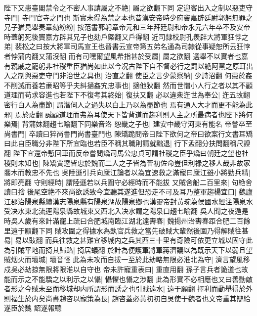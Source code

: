 陛下又患臺閣禁令之不密人事請屬之不絶|{
	屬之欲翻下同}
定迎客出入之制以惡吏守寺門|{
	寺門官寺之門也}
斯實未得為禁之本也昔漢安帝時少府竇嘉辟廷尉郭躬無罪之兄子猶見舉奏章劾紛紛|{
	按范書郭躬章帝元和三年拜廷尉和帝永元六年卒不及安帝時蓋躬死後竇嘉方辟其兄子也劾戶槩翻又戶得翻}
近司隸校尉孔羨辟大將軍狂悖之弟|{
	裴松之曰按大將軍司馬宣王也晉書云宣帝第五弟名通為司隸從事疑恕所云狂悖者悖蒲内翻又蒲沒翻}
而有司嘿爾望風希指甚於受屬|{
	屬之欲翻}
選舉不以實者也嘉有親戚之寵躬非社稷重臣猶尚如此以今况古陛下自不督必行之罰以絶阿黨之原耳出入之制與惡吏守門非治世之具也|{
	治直之翻}
使臣之言少蒙察納|{
	少詩沼翻}
何患於姦不削滅而養若亷昭等乎夫糾擿姦宄忠事也|{
	擿他狄翻}
然而世憎小人行之者以其不顧道理而苟求容進也若陛下不復考其終始|{
	復扶又翻}
必以違衆迕世為奉公|{
	迕五故翻}
密行白人為盡節|{
	謂潛伺人之過失以白上乃以為盡節也}
焉有通人大才而更不能為此邪|{
	焉於䖍翻}
誠顧道理而弗為耳使天下皆背道而趨利則人主之所最病者也陛下將何樂焉|{
	背蒲妹翻趨七喻翻下同樂音洛}
恕畿之子也|{
	建安中畿守河東有能名}
帝嘗卒至尚書門|{
	卒讀曰猝尚書門尚書臺門也}
陳矯跪問帝曰陛下欲何之帝曰欲案行文書耳矯曰此自臣職分非陛下所宜臨也若臣不稱其職則請就黜退|{
	行下孟翻分扶問翻稱尺證翻}
陛下宜還帝慙回車而反帝嘗問矯司馬公忠貞可謂社稷之臣乎矯曰朝廷之望也社稷則未知也|{
	陳矯賈逵皆忠於魏而二人之子皆為晉初佐命豈但利禄之移人哉非故家喬木而教忠不先也}
吳陸遜引兵向廬江論者以為宜速救之滿寵曰廬江雖小將勁兵精|{
	將即亮翻}
守則經時|{
	謂陸遜若以兵圍守必經時而不能拔}
又賊舍船二百里來|{
	句絶舍讀曰捨}
後尾空絶不來尚欲誘致今宜聽其遂進但恐走不可及耳乃整軍趨楊宜口|{
	魏廬江郡治陽泉縣續漢志陽泉縣有陽泉湖故陽泉鄉也漢靈帝封黃琬為侯國水經注陽泉水受决水東北流逕陽泉縣故城東又西北入决水謂之陽泉口趨七喻翻}
吳人聞之夜遁是時吳人歲有來計滿寵上疏曰合肥城南臨江湖北遠夀春|{
	魏揚州治夀春距合肥二百餘里遠于願翻下同}
賊攻圍之得據水為埶官兵救之當先破賊大輩然後圍乃得解賊往甚易|{
	易以䜴翻}
而兵往救之甚難宜移城内之兵其西三十里有奇險可依更立城以固守此為引賊平地而掎其歸路|{
	掎居蟻翻}
於計為便護軍將軍蔣濟議以為既示天下以弱且望賊烟火而壞城|{
	壞音怪}
此為未攻而自拔一至於此劫略無限必淮北為守|{
	濟言望風移戍吳必劫掠無限將限淮以自守也}
帝未許寵重表曰|{
	重直用翻}
孫子言兵者詭道也故能而示之不能驕之以利示之以懾|{
	懾懼也懾之涉翻}
此為形實不必相應也又曰善動敵者形之今賊未至而移城却内所謂形而誘之也引賊遠水|{
	遠于願翻}
擇利而動舉得於外則福生於内矣尚書趙咨以寵策為長|{
	趙咨蓋必黃初初自吳使于魏者也文帝重其辯給遂臣於魏}
詔遂報聽

